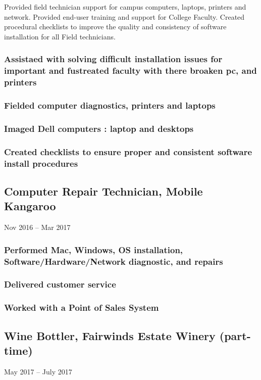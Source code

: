 \documentclass{article}
\begin{document}
        \vspace{0mm}
        Provided field technician support for campus computers, laptops, printers and network. Provided end-user training and support for College Faculty. Created procedural checklists to improve the quality and consistency of software installation for all Field technicians.

        \vspace{-2mm}
    	\subsubsection{Assistaed with solving difficult installation issues for important and fustreated faculty with there broaken pc, and printers  }
    	\subsubsection{Fielded computer diagnostics, printers and laptops }
    	\subsubsection{Imaged Dell computers : laptop and desktops }
    	\subsubsection{Created checklists to ensure proper and consistent software install procedures}
    	
    \subsection{Computer Repair Technician, Mobile Kangaroo} Nov 2016 – Mar 2017
        
        \vspace{-2mm}
        \subsubsection{Performed Mac, Windows, OS installation, Software/Hardware/Network diagnostic, and repairs}
    	\subsubsection{Delivered customer service}
    	\subsubsection{Worked with a Point of Sales System}
	\subsection{Wine Bottler, Fairwinds Estate Winery (part-time)} May 2017 – July 2017
		\vspace{-2mm}
\end{document}
